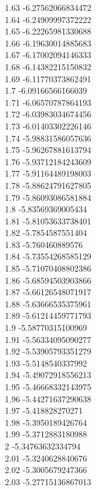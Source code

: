 {1.63	-6.27562066834472\\
1.64	-6.24909997372222\\
1.65	-6.22265981330688\\
1.66	-6.19630014885683\\
1.67	-6.17002094146333\\
1.68	-6.14382215150832\\
1.69	-6.11770373862491\\
1.7	-6.09166566166039\\
1.71	-6.06570787864193\\
1.72	-6.03983034674456\\
1.73	-6.01403302226146\\
1.74	-5.98831586057636\\
1.75	-5.96267881613794\\
1.76	-5.93712184243609\\
1.77	-5.91164489198003\\
1.78	-5.88624791627805\\
1.79	-5.86093086581884\\
1.8	-5.83569369005434\\
1.81	-5.81053633738401\\
1.82	-5.7854587551404\\
1.83	-5.760460889576\\
1.84	-5.73554268585129\\
1.85	-5.71070408802386\\
1.86	-5.68594503903866\\
1.87	-5.66126548071917\\
1.88	-5.63666535375961\\
1.89	-5.61214459771793\\
1.9	-5.58770315100969\\
1.91	-5.56334095090277\\
1.92	-5.53905793351279\\
1.93	-5.5148540337992\\
1.94	-5.49072918556213\\
1.95	-5.46668332143975\\
1.96	-5.44271637290638\\
1.97	-5.418828270271\\
1.98	-5.3950189426764\\
1.99	-5.3712883180988\\
2	-5.34763632334794\\
2.01	-5.3240628840676\\
2.02	-5.3005679247366\\
2.03	-5.27715136867013\\
}
